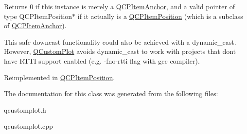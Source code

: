 Returns 0 if this instance is merely a \hyperlink{classQCPItemAnchor}{Q\+C\+P\+Item\+Anchor}, and a valid pointer of type Q\+C\+P\+Item\+Position$\ast$ if it actually is a \hyperlink{classQCPItemPosition}{Q\+C\+P\+Item\+Position} (which is a subclass of \hyperlink{classQCPItemAnchor}{Q\+C\+P\+Item\+Anchor}).

This safe downcast functionality could also be achieved with a dynamic\+\_\+cast. However, \hyperlink{classQCustomPlot}{Q\+Custom\+Plot} avoids dynamic\+\_\+cast to work with projects that don\textquotesingle{}t have R\+T\+TI support enabled (e.\+g. -\/fno-\/rtti flag with gcc compiler). 

Reimplemented in \hyperlink{classQCPItemPosition_a008ff9ebe645a963671b68bcf7f7a1c0}{Q\+C\+P\+Item\+Position}.



The documentation for this class was generated from the following files\+:\begin{DoxyCompactItemize}
\item 
qcustomplot.\+h\item 
qcustomplot.\+cpp\end{DoxyCompactItemize}
